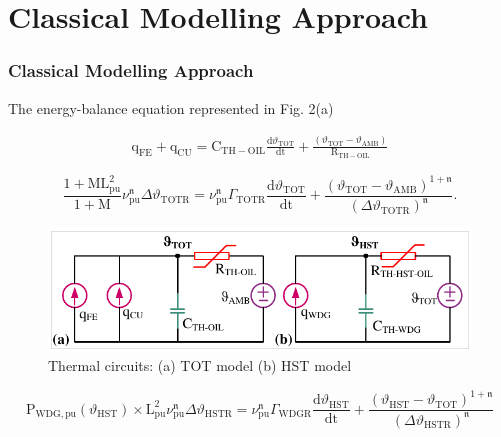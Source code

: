 \documentclass[10pt,hyperref={pdfpagelabels=false}]{beamer}
\begin{document}
\section{Classical Modelling Approach}
\begin{frame}[fragile]
\frametitle{Classical Modelling Approach}
The energy-balance equation represented in Fig. 2(a) 
\begin{small}
\begin{align}\label{rcequation}
    \mathrm{q_{FE}}+\mathrm{q_{CU}}=\mathrm{C}_{\mathrm{TH-OIL}}\frac{\mathrm{d} \vartheta_{\mathrm{TOT}}}{\mathrm{d} \mathrm{t}}+
    \frac{(\vartheta_{\mathrm{TOT}}-\vartheta_{\mathrm{AMB}})}{\mathrm{R}_{\mathrm{TH-OIL}}}
\end{align}
\end{small}
\begin{small}
\begin{equation}\label{s1}
    \frac{1+\mathrm{M} \mathrm{L}_{\mathrm{pu}}^2}{1+\mathrm{M}}  \nu_{\mathrm{pu}}^{\boldsymbol{\mathfrak{n}}}  \Delta\vartheta_{\mathrm{TOTR}}=
    \nu_{\mathrm{pu}}^{\boldsymbol{\mathfrak{n}}} \Gamma_{\mathrm{TOTR}}\frac{\mathrm{d} \vartheta_{\mathrm{TOT}}}{\mathrm{d} \mathrm{t}}+\frac{\left ( \vartheta_{\mathrm{TOT}}-\vartheta_{\mathrm{AMB}} \right )^{1+{\boldsymbol{\mathfrak{n}}}}}{(\Delta\vartheta_{\mathrm{TOTR}})^{\boldsymbol{\mathfrak{n}}}}.
\end{equation}
 \end{small}
\begin{figure}
    \centering
    \includegraphics[scale=0.70]{Images/RC11.pdf}
    \caption{Thermal circuits: (a) TOT model (b) HST model}
    \label{fig:Problem_5_1_1}
\end{figure}
\begin{small}
\begin{equation}\label{hs1}
     \mathrm{P}_{\mathrm{WDG,pu}}(\vartheta_{\mathrm{HST}})\times \mathrm{L}_{\mathrm{pu}}^2  \nu_{\mathrm{pu}}^{\boldsymbol{\mathfrak{n}}} \Delta\vartheta_{\mathrm{HSTR}}=
\nu_{\mathrm{pu}}^{\boldsymbol{\mathfrak{n}}} \Gamma_{\mathrm{WDGR}}\frac{\mathrm{d} \vartheta_{{\mathrm{HST}}}}{\mathrm{d} \mathrm{t}}+\frac{\left ( \vartheta_{\mathrm{HST}}-\vartheta_{\mathrm{TOT}} \right )^{1+{\boldsymbol{\mathfrak{n}}}}}{(\Delta\vartheta_{{\mathrm{HSTR}}})^{\boldsymbol{\mathfrak{n}}}}
\end{equation}
\end{small}
\end{frame}
\end{document}
